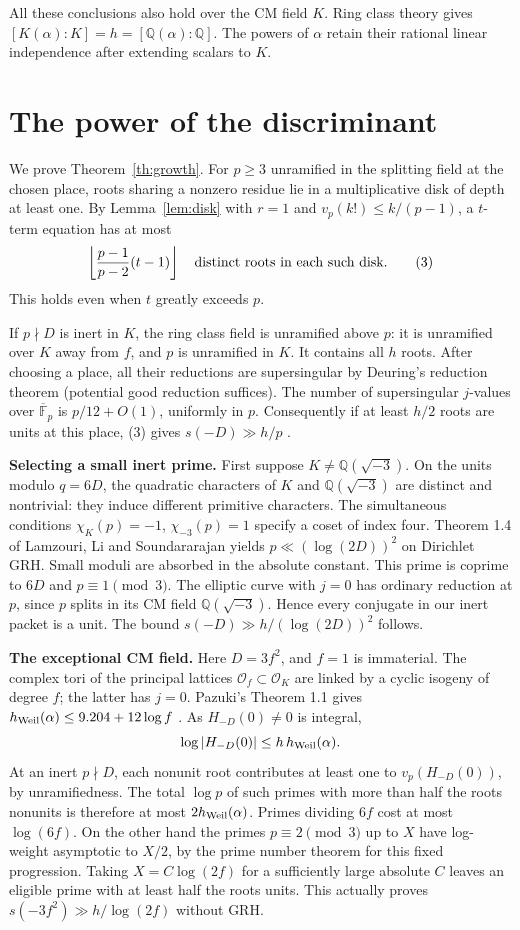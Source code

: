 \documentclass[11pt,letterpaper]{article}
\newcommand{\Q}{\mathbb Q}\newcommand{\Z}{\mathbb Z}\newcommand{\F}{\mathbb F}
\newcommand{\heading}[1]{\textbf{\color{ink}#1}}
\begin{document}
All these conclusions also hold over the CM field $K$. Ring class theory gives $[K(\alpha):K]=h=[\Q(\alpha):\Q]$. The powers of $\alpha$ retain their rational linear independence after extending scalars to $K$.
\clearpage

\clearpage
\section{The power of the discriminant}\label{sec:growth}
We prove Theorem~\ref{th:growth}. For $p\ge3$ unramified in the splitting field at the chosen place, roots sharing a nonzero residue lie in a multiplicative disk of depth at least one. By Lemma~\ref{lem:disk} with $r=1$ and $v_p(k!)\le k/(p-1)$, a $t$-term equation has at most
\[
 \left\lfloor\frac{p-1}{p-2}(t-1)\right\rfloor
 \quad\hbox{distinct roots in each such disk}.                 \tag{3}
\]
This holds even when $t$ greatly exceeds $p$.

If $p\nmid D$ is inert in $K$, the ring class field is unramified above $p$: it is unramified over $K$ away from $f$, and $p$ is unramified in $K$. It contains all $h$ roots. After choosing a place, all their reductions are supersingular by Deuring's reduction theorem (potential good reduction suffices). The number of supersingular $j$-values over $\overline{\F}_p$ is $p/12+O(1)$, uniformly in $p$. Consequently if at least $h/2$ roots are units at this place, (3) gives $s(-D)\gg h/p$ \cite{cm,deuring}.

\heading{Selecting a small inert prime.} First suppose $K\ne\Q(\sqrt{-3})$. On the units modulo $q=6D$, the quadratic characters of $K$ and $\Q(\sqrt{-3})$ are distinct and nontrivial: they induce different primitive characters. The simultaneous conditions $\chi_K(p)=-1$, $\chi_{-3}(p)=1$ specify a coset of index four. Theorem 1.4 of Lamzouri, Li and Soundararajan \cite{lls} yields $p\ll (\log(2D))^2$ on Dirichlet GRH. Small moduli are absorbed in the absolute constant. This prime is coprime to $6D$ and $p\equiv1\pmod3$. The elliptic curve with $j=0$ has ordinary reduction at $p$, since $p$ splits in its CM field $\Q(\sqrt{-3})$. Hence every conjugate in our inert packet is a unit. The bound $s(-D)\gg h/(\log(2D))^2$ follows.

\heading{The exceptional CM field.} Here $D=3f^2$, and $f=1$ is immaterial. The complex tori of the principal lattices $\mathcal O_f\subset\mathcal O_K$ are linked by a cyclic isogeny of degree $f$; the latter has $j=0$. Pazuki's Theorem 1.1 gives $h_{\rm Weil}(\alpha)\le9.204+12\log f$ \cite{pazuki}. As $H_{-D}(0)\ne0$ is integral,
\[
  \log |H_{-D}(0)| \le h\,h_{\rm Weil}(\alpha).
\]
At an inert $p\nmid D$, each nonunit root contributes at least one to $v_p(H_{-D}(0))$, by unramifiedness. The total $\log p$ of such primes with more than half the roots nonunits is therefore at most $2h_{\rm Weil}(\alpha)$. Primes dividing $6f$ cost at most $\log(6f)$. On the other hand the primes $p\equiv2\pmod3$ up to $X$ have log-weight asymptotic to $X/2$, by the prime number theorem for this fixed progression. Taking $X=C\log(2f)$ for a sufficiently large absolute $C$ leaves an eligible prime with at least half the roots units. This actually proves $s(-3f^2)\gg h/\log(2f)$ without GRH.
\end{document}

